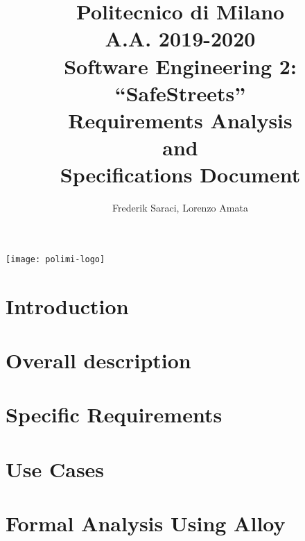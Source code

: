 \documentclass[a4paper]{article}
\author{Frederik Saraci, Lorenzo Amata}
\date{}
\title{Politecnico di Milano
	\\A.A. 2019\@-\@2020
	\\Software Engineering 2: ``SafeStreets''
	\\\textbf{R}equirements \textbf{A}nalysis \\and\\ \textbf{S}pecifications \textbf{D}ocument}
\begin{document}
\maketitle
\begin{center}
	\texttt{[image: polimi-logo]}
\end{center}
\clearpage
\tableofcontents
\clearpage

\section{Introduction}


\clearpage
\section{Overall description}


\clearpage


\section{Specific Requirements}


\clearpage

\section{Use Cases}



\section{Formal Analysis Using Alloy}


\clearpage


\end{document}
